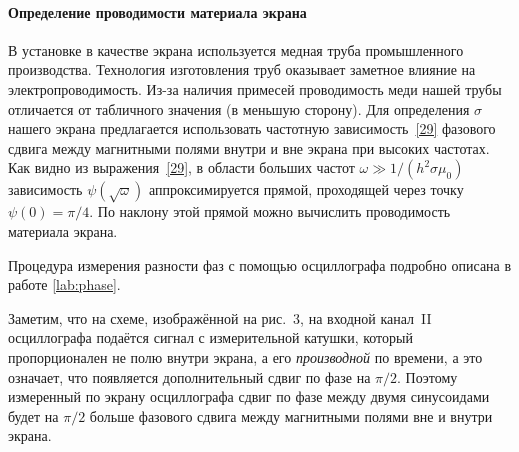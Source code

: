 
\paragraph{Определение проводимости материала экрана}

В установке в качестве экрана используется медная труба промышленного
производства. Технология изготовления труб оказывает заметное влияние
на электропроводимость. Из-за наличия примесей проводимость меди нашей
трубы отличается от табличного значения (в меньшую сторону).
Для определения $\sigma$ нашего экрана предлагается использовать
частотную зависимость~\eqref{29} фазового сдвига между магнитными полями
внутри и вне экрана при высоких частотах. Как видно из выражения~\eqref{29},
в области больших частот $\omega \gg 1/(h^2\sigma\mu_0)$ зависимость
$\psi(\sqrt{\omega})$ аппроксимируется прямой, проходящей
через точку $\psi(0)=\pi/4$.
По наклону этой прямой можно вычислить проводимость материала экрана.

Процедура измерения разности фаз с помощью осциллографа
подробно описана в работе \ref{lab:phase}.

Заметим, что на схеме, изображённой на рис.~3, на входной канал~II
осциллографа подаётся сигнал с измерительной катушки, который пропорционален
не полю внутри экрана, а его \emph{производной} по времени, а это означает,
что появляется дополнительный сдвиг по фазе на $\pi/2$. Поэтому измеренный
по экрану осциллографа сдвиг по фазе между двумя синусоидами будет
на $\pi/2$ больше фазового сдвига между магнитными полями вне и
внутри экрана.



